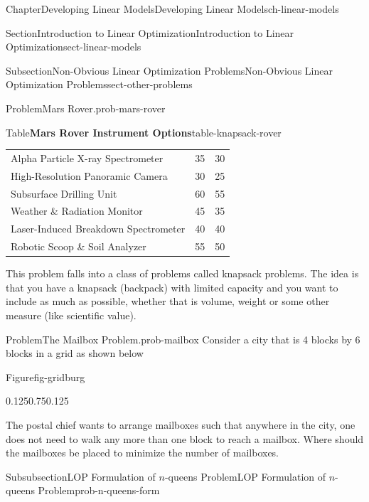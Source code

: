 \documentclass[oneside,10pt,]{book}
\numberwithin{equation}{section}
\begin{document}
\begin{chapterptx}{Chapter}{Developing Linear Models}{}{Developing Linear Models}{}{}{ch-linear-models}
\begin{sectionptx}{Section}{Introduction to Linear Optimization}{}{Introduction to Linear Optimization}{}{}{sect-linear-models}
\begin{subsectionptx}{Subsection}{Non-Obvious Linear Optimization Problems}{}{Non-Obvious Linear Optimization Problems}{}{}{sect-other-problems}
\begin{introduction}{}
\begin{problem}{Problem}{Mars Rover.}{prob-mars-rover}
\begin{tableptx}{Table}{\textbf{Mars Rover Instrument Options}}{table-knapsack-rover}{}
{\begin{tabular}{lll}
Alpha Particle X-ray Spectrometer&\multicolumn{1}{c}{35}&\multicolumn{1}{c}{30}\tabularnewline[0pt]
High-Resolution Panoramic Camera&\multicolumn{1}{c}{30}&\multicolumn{1}{c}{25}\tabularnewline[0pt]
Subsurface Drilling Unit&\multicolumn{1}{c}{60}&\multicolumn{1}{c}{55}\tabularnewline[0pt]
Weather \& Radiation Monitor&\multicolumn{1}{c}{45}&\multicolumn{1}{c}{35}\tabularnewline[0pt]
Laser-Induced Breakdown Spectrometer&\multicolumn{1}{c}{40}&\multicolumn{1}{c}{40}\tabularnewline[0pt]
Robotic Scoop \& Soil Analyzer&\multicolumn{1}{c}{55}&\multicolumn{1}{c}{50}
\end{tabular}
}%
\end{tableptx}%
\end{problem}
%
This problem falls into a class of problems called knapsack problems. The idea is that you have a knapsack (backpack) with limited capacity and you want to include as much as possible, whether that is volume, weight or some other measure (like scientific value).%
\begin{problem}{Problem}{The Mailbox Problem.}{prob-mailbox}%
Consider a city that is 4 blocks by 6 blocks in a grid as shown below%
\begin{figureptx}{Figure}{}{fig-gridburg}{}%
\begin{image}{0.125}{0.75}{0.125}{}%
%
\end{image}%
\tcblower
\end{figureptx}%
The postal chief wants to arrange mailboxes such that anywhere in the city, one does not need to walk any more than one block to reach a mailbox.  Where should the mailboxes be placed to minimize the number of mailboxes.\footnotemark{}%
\end{problem}
%
\end{introduction}%
%
%
\typeout{************************************************}
\typeout{************************************************}
%
\begin{subsubsectionptx}{Subsubsection}{LOP Formulation of \(n\)-queens Problem}{}{LOP Formulation of \(n\)-queens Problem}{}{}{prob-n-queens-form}

\end{subsubsectionptx}
\end{subsectionptx}
\end{sectionptx}
\end{chapterptx}
\end{document}
